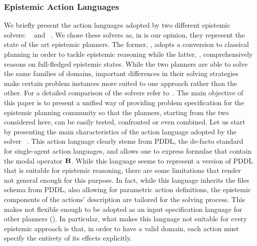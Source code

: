 \subsubsection{Epistemic Action Languages}
We briefly present the action languages adopted by two different epistemic solvers: \rpmep~\cite{muise2015planning} and \EFP~\cite{Fab20}.
We chose these solvers as, in is our opinion, they represent the state of the art epistemic planners. %
The former, \ie \rpmep, adopts a conversion to classical planning in order to tackle epistemic reasoning while the latter, \ie \EFP, comprehensively reasons on full-fledged epistemic states.
While the two planners are able to solve the same families of domains, important differences in their solving strategies make certain problem instances more suited to one approach rather than the other. For a detailed comparison of the solvers refer to~\cite{Fab20,le2018EFP}.
The main objective of this paper is to present a unified way of providing problem specification for the epistemic planning community so that the planners, starting from the two considered here, can be easily tested, confronted or even combined.
%
%
%
\mypar{\pdkbpddl} Let us start by presenting the main characteristics of the action language \pdkbpddl adopted by the solver \rpmep~\cite{muise2015planning,rpmep}.
This action language clearly stems from PDDL, the  de-facto standard for single-agent action languages, and allows one to express formulae that contain the modal operator $\textbf{B}_{\mathsf{}}$.
While this language seems to represent a version of PDDL that is suitable for epistemic reasoning, %
there are some limitations that render \pdkbpddl not general enough for this purpose. %
In fact, while this language inherits the files schema from PDDL, also allowing for parametric action definitions, the epistemic components of the actions' description are tailored for the \rpmep solving process. This makes \pdkbpddl not flexible enough to be adopted as an input specification language for other planners (\eg \EFP). 
In particular, what makes this language not suitable for every epistemic approach is that, in order to have a valid \pdkbpddl domain, each action must specify the entirety of its effects explicitly.
